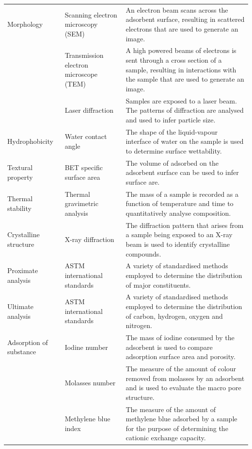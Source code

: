 \begin{small}
\begin{longtable}{>{\raggedright\arraybackslash}p{2.5cm}>{\raggedright\arraybackslash}p{3cm}p{7cm}}
	Morphology & Scanning electron microscopy (SEM) & An electron beam scans across the adsorbent surface, resulting in scattered electrons that are used to generate an image. \\ 
	& Transmission electron microscope (TEM) & A high powered beams of electrons is sent through a cross section of a sample, resulting in interactions with the sample that are used to generate an image.  \\ 
	& Laser diffraction & Samples are exposed to a laser beam. The patterns of diffraction are analysed and used to infer particle size. \\ 

	Hydrophobicity & Water contact angle & The shape of the liquid-vapour interface of water on the sample is used to determine surface wettability. \\ 

	Textural property & BET specific surface area & The volume of \ce{N_2} adsorbed on the adsorbent surface can be used to infer surface are. \\ 

	Thermal stability & Thermal gravimetric analysis & The mass of a sample is recorded as a function of temperature and time to quantitatively analyse composition. \\ 

	Crystalline structure & X-ray diffraction & The diffraction pattern that arises from a sample being exposed to an X-ray beam is used to identify crystalline compounds. \\ 

	Proximate analysis & ASTM international standards & A variety of standardised methods employed to determine the distribution of major constituents. \\ 

	Ultimate analysis  & ASTM international standards & A variety of standardised methods employed to determine the distribution of carbon, hydrogen, oxygen and nitrogen. \\ 
	Adsorption of substance & Iodine number & The mass of iodine consumed by the adsorbent is used to compare adsorption surface area and porosity. \\ 
	& Molasses number & The measure of the amount of colour removed from molasses by an adsorbent and is used to evaluate the macro pore structure. \\ 
	& Methylene blue index & The measure of the amount of methylene blue adsorbed by a sample for the purpose of determining the cationic exchange capacity. \\
\end{longtable}
\end{small}

